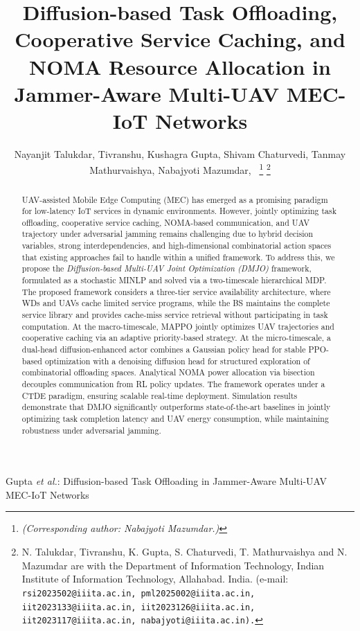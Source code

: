 \documentclass[journal]{IEEEtran}
\begin{document}
\title{Diffusion-based Task Offloading, Cooperative Service Caching, and NOMA Resource Allocation in Jammer-Aware Multi-UAV MEC-IoT Networks}

\author{Nayanjit Talukdar, Tivranshu, Kushagra Gupta, Shivam Chaturvedi, Tanmay Mathurvaishya, Nabajyoti Mazumdar,~ 
    \thanks{\emph{(Corresponding author: Nabajyoti
Mazumdar.)} }
    \thanks{N. Talukdar, Tivranshu, K. Gupta, S. Chaturvedi, T. Mathurvaishya and N. Mazumdar are with the Department of Information Technology, Indian Institute of Information Technology, Allahabad. India. (e-mail: \texttt{rsi2023502@iiita.ac.in, pml2025002@iiita.ac.in, iit2023133@iiita.ac.in, iit2023126@iiita.ac.in, iit2023117@iiita.ac.in, nabajyoti@iiita.ac.in).}}
     
}
%
{Gupta \MakeLowercase{\textit{et al.}}: Diffusion-based Task Offloading in Jammer-Aware Multi-UAV MEC-IoT Networks}


\maketitle
\begin{abstract}
UAV-assisted Mobile Edge Computing (MEC) has emerged as a promising paradigm for low-latency IoT services in dynamic environments. However, jointly optimizing task offloading, cooperative service caching, NOMA-based communication, and UAV trajectory under adversarial jamming remains challenging due to hybrid decision variables, strong interdependencies, and high-dimensional combinatorial action spaces that existing approaches fail to handle within a unified framework. To address this, we propose the \textit{Diffusion-based Multi-UAV Joint Optimization (DMJO)} framework, formulated as a stochastic MINLP and solved via a two-timescale hierarchical MDP. The proposed framework considers a three-tier service availability architecture, where WDs and UAVs cache limited service programs, while the BS maintains the complete service library and provides cache-miss service retrieval without participating in task computation. At the macro-timescale, MAPPO jointly optimizes UAV trajectories and cooperative caching via an adaptive priority-based strategy. At the micro-timescale, a dual-head diffusion-enhanced actor combines a Gaussian policy head for stable PPO-based optimization with a denoising diffusion head for structured exploration of combinatorial offloading spaces. Analytical NOMA power allocation via bisection decouples communication from RL policy updates. The framework operates under a CTDE paradigm, ensuring scalable real-time deployment. Simulation results demonstrate that DMJO significantly outperforms state-of-the-art baselines in jointly optimizing task completion latency and UAV energy consumption, while maintaining robustness under adversarial jamming.
\end{abstract}
\end{document}
